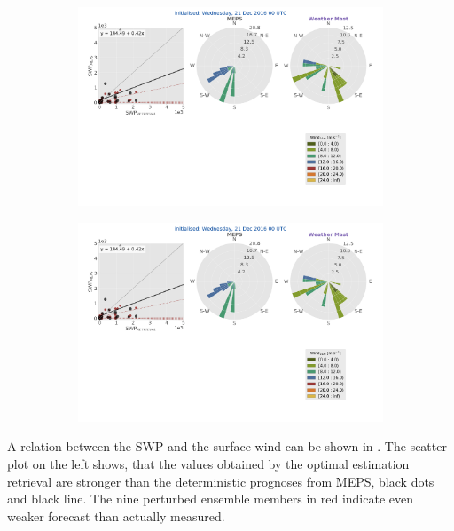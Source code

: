 \begin{figure}[h]
	\begin{subfigure}[b]{0.84\textwidth}
		\includegraphics[trim={2.3cm 19.5cm 2.cm .7cm},clip,width=\textwidth]{./fig_windrose/20161221}
	\end{subfigure}
	\begin{subfigure}[b]{0.15\textwidth}
		\includegraphics[trim={50.cm 0.cm 8.3cm 28.4cm},clip,width=\textwidth]{./fig_windrose/20161221}
	\end{subfigure}
	\caption{}\label{fig:wind21}
\end{figure}
A relation between the SWP and the surface wind can be shown in . The scatter plot on the left shows, that  the values obtained by the optimal estimation retrieval are stronger than the deterministic prognoses from MEPS, black dots and black line. The nine perturbed ensemble members in red indicate even weaker forecast than actually measured. 
